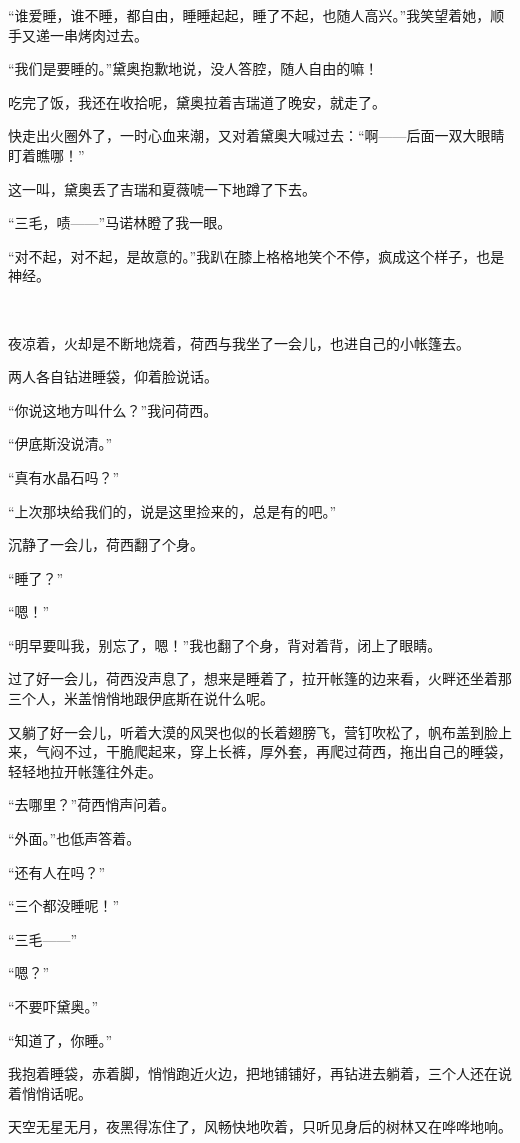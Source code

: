 \par “谁爱睡，谁不睡，都自由，睡睡起起，睡了不起，也随人高兴。”我笑望着她，顺手又递一串烤肉过去。
\par “我们是要睡的。”黛奥抱歉地说，没人答腔，随人自由的嘛！
\par 吃完了饭，我还在收拾呢，黛奥拉着吉瑞道了晚安，就走了。
\par 快走出火圈外了，一时心血来潮，又对着黛奥大喊过去：“啊——后面一双大眼睛盯着瞧哪！”
\par 这一叫，黛奥丢了吉瑞和夏薇唬一下地蹲了下去。
\par “三毛，啧——”马诺林瞪了我一眼。
\par “对不起，对不起，是故意的。”我趴在膝上格格地笑个不停，疯成这个样子，也是神经。
\par  
\par 夜凉着，火却是不断地烧着，荷西与我坐了一会儿，也进自己的小帐篷去。
\par 两人各自钻进睡袋，仰着脸说话。
\par “你说这地方叫什么？”我问荷西。
\par “伊底斯没说清。”
\par “真有水晶石吗？”
\par “上次那块给我们的，说是这里捡来的，总是有的吧。”
\par 沉静了一会儿，荷西翻了个身。
\par “睡了？”
\par “嗯！”
\par “明早要叫我，别忘了，嗯！”我也翻了个身，背对着背，闭上了眼睛。
\par 过了好一会儿，荷西没声息了，想来是睡着了，拉开帐篷的边来看，火畔还坐着那三个人，米盖悄悄地跟伊底斯在说什么呢。
\par 又躺了好一会儿，听着大漠的风哭也似的长着翅膀飞，营钉吹松了，帆布盖到脸上来，气闷不过，干脆爬起来，穿上长裤，厚外套，再爬过荷西，拖出自己的睡袋，轻轻地拉开帐篷往外走。
\par “去哪里？”荷西悄声问着。
\par “外面。”也低声答着。
\par “还有人在吗？”
\par “三个都没睡呢！”
\par “三毛——”
\par “嗯？”
\par “不要吓黛奥。”
\par “知道了，你睡。”
\par 我抱着睡袋，赤着脚，悄悄跑近火边，把地铺铺好，再钻进去躺着，三个人还在说着悄悄话呢。
\par 天空无星无月，夜黑得冻住了，风畅快地吹着，只听见身后的树林又在哗哗地响。
